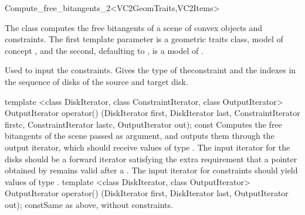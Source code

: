 
\ccRefPageBegin

\begin{ccRefFunctionObjectClass}{Compute_free_bitangents_2<VC2GeomTraits,VC2Items>}

\ccDefinition
  
The class \ccRefName{} computes the free bitangents of a scene of convex
objects and constraints. The first template parameter is a geometric traits
class, model of concept , and the second, defaulting to
, is a model of .


\ccTypes
{}

\ccGlue
{}
\ccGlue
{}
{Used to input the constraints. Gives the type of theconstraint and the
indexes in the sequence of disks of the source and target disk.}

\ccOperations
\ccMethod
{template <class DiskIterator, class ConstraintIterator, class OutputIterator>
  OutputIterator operator()
    (DiskIterator first, DiskIterator last,
     ConstraintIterator firstc, ConstraintIterator lastc,
     OutputIterator out); const}
{Computes the free bitangents of the scene passed as argument, and outputs
them through the output iterator, which should receive values of type
. The input iterator for the disks should be a forward
iterator satisfying the extra requirement that a pointer obtained by
 remains valid after a \ccc{++}. The input iterator for
constraints should yield values of type .}
\ccGlue
\ccMethod
{template <class DiskIterator, class OutputIterator>
  OutputIterator operator()
    (DiskIterator first, DiskIterator last,
     OutputIterator out); const}{Same as above, without constraints.}
\ccTagDefaults



\end{ccRefFunctionObjectClass}
